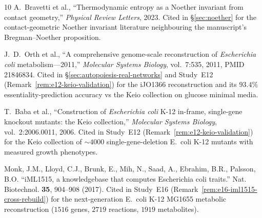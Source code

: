 \documentclass[11pt,a4paper]{article}
\theoremstyle{plain}
\theoremstyle{definition}
\theoremstyle{remark}
\begin{document}
\begin{thebibliography}{10}
A.~Bravetti et al., ``Thermodynamic entropy as a Noether invariant from
  contact geometry,'' \emph{Physical Review Letters}, 2023. Cited in
  \S\ref{sec:noether} for the contact-geometric Noether invariant
  literature neighbouring the manuscript's Bregman--Noether proposition.

J.~D.~Orth et al., ``A comprehensive genome-scale reconstruction of
  \emph{Escherichia coli} metabolism---2011,'' \emph{Molecular Systems
  Biology}, vol.~7:535, 2011, PMID 21846834. Cited in
  \S\ref{sec:autopoiesis-real-networks} and Study~E12
  (Remark~\ref{rem:e12-keio-validation}) for the iJO1366 reconstruction
  and its $93.4\%$ essentiality-prediction accuracy vs the Keio collection
  on glucose minimal media.

T.~Baba et al., ``Construction of \emph{Escherichia coli} K-12 in-frame,
  single-gene knockout mutants: the Keio collection,'' \emph{Molecular
  Systems Biology}, vol.~2:2006.0011, 2006. Cited in Study~E12
  (Remark~\ref{rem:e12-keio-validation}) for the Keio collection of
  $\sim 4000$ single-gene-deletion E.~coli K-12 mutants with measured
  growth phenotypes.

 Monk, J.M., Lloyd, C.J., Brunk, E., Mih, N., Saad,
A., Ebrahim, B.R., Palsson, B.O. ``iML1515, a knowledgebase that computes
Escherichia coli traits.'' Nat. Biotechnol. \textbf{35}, 904--908 (2017).
Cited in Study~E16 (Remark~\ref{rem:e16-iml1515-cross-rebuild}) for the
next-generation E.~coli K-12 MG1655 metabolic reconstruction ($1516$
genes, $2719$ reactions, $1919$ metabolites).

\end{thebibliography}
\end{document}
